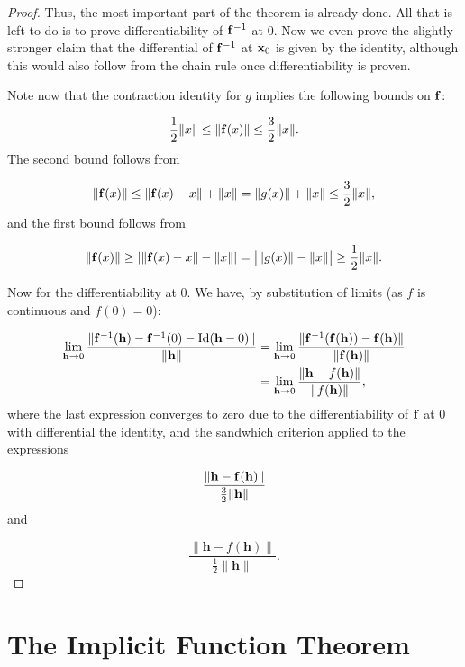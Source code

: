 \begin{proof}
Thus, the most important part of the theorem is already done. All that
is left to do is to prove differentiability of \(\mathbf{ f}^{-1}\) at \(0\). Now
we even prove the slightly stronger claim that the differential of
\(\mathbf{ f}^{-1}\) at \(\mathbf{ x}_0\) is given by the identity, although this would also
follow from the chain rule once differentiability is proven.

Note now that the contraction identity for \(g\) implies the following
bounds on \(\mathbf{ f}\):

\[\frac{1}{2}\|x\| \le \|\mathbf{ f}(x)\| \le \frac{3}{2} \|x\|.\] The second
bound follows from

\[\|\mathbf{ f}(x)\| \le \|\mathbf{ f}(x) - x\| + \|x\| = \|g(x)\| + \|x\| \le \frac{3}{2} \|x\|,\]
and the first bound follows from

\[\|\mathbf{ f}(x)\| \ge |\|\mathbf{ f}(x) - x\| - \|x\|| = \left| \|g(x)\| - \|x\| \right| \ge \frac{1}{2} \|x\|.\]

Now for the differentiability at \(0\). We have, by substitution of
limits (as \(f\) is continuous and \(f(0) = 0\)):

\begin{align}
\lim_{\mathbf h \to 0} \frac{\|\mathbf{ f}^{-1}(\mathbf h) - \mathbf{ f}^{-1}(0) - \operatorname{Id} (\mathbf h - 0)\|}{\|\mathbf h\|} & = \lim_{\mathbf h \to 0} \frac{\|\mathbf{ f}^{-1}(\mathbf{ f}(\mathbf h)) - \mathbf{ f}(\mathbf h)\|}{\|\mathbf{ f}(\mathbf h)\|} \\
& = \lim_{\mathbf h \to 0} \frac{\|\mathbf h - f(\mathbf h)\|}{\|f(\mathbf h)\|},
\end{align}
where the last expression converges to zero due to the
differentiability of \(\mathbf{ f}\) at \(0\) with differential the identity, and
the sandwhich criterion applied to the expressions

\[\frac{\|\mathbf h - \mathbf{ f}(\mathbf h)\|}{\frac{3}{2} \|\mathbf h\|}\] and

\[\frac{\|\mathbf h - f(\mathbf h)\|}{\frac{1}{2} \|\mathbf h\|}.\]
\end{proof}

\section{The Implicit Function Theorem}\label{the-implicit-function-theorem}


